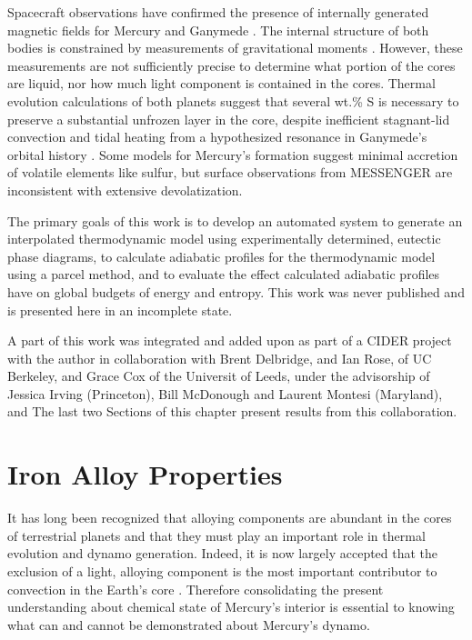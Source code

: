 Spacecraft observations have confirmed the presence of internally generated
magnetic fields for Mercury \cite{Anderson2011} and Ganymede \cite{Kivelson1996}.
The internal structure of both bodies is constrained by measurements of
gravitational moments \cite{Smith2012,Hauck2006}. However, these measurements are
not sufficiently precise to determine what portion of the cores are liquid, nor
how much light component is contained in the cores. Thermal evolution
calculations of both planets \cite{Hauck2004,Hauck2006,Breuer2007,Bland2008} suggest
that several wt.\% S is necessary to preserve a substantial unfrozen layer in
the core, despite inefficient stagnant-lid convection
\cite{Solomatov2000,Hauck2004,Breuer2007} and tidal heating from a hypothesized
resonance in Ganymede's orbital history \cite{Showman1997,Bland2008}. Some models
for Mercury's formation suggest minimal accretion of volatile elements like
sulfur, but surface observations from MESSENGER \cite{Nittler2011,Mccubbin2012} are
inconsistent with extensive devolatization.

The primary goals of this work is to develop an automated system to generate an
interpolated thermodynamic model using experimentally determined, eutectic
phase diagrams, to calculate adiabatic profiles for the thermodynamic model
using a parcel method, and to evaluate the effect calculated adiabatic profiles
have on global budgets of energy and entropy. This work was never published and
is presented here in an incomplete state.

A part of this work was integrated and added upon as part of a CIDER project with the
author in collaboration with Brent Delbridge, and Ian Rose, of UC Berkeley, and Grace
Cox of the Universit of Leeds, under the advisorship of Jessica Irving (Princeton),
Bill McDonough and Laurent Montesi (Maryland), and  The last two Sections of this
chapter present results from this collaboration.

\section{Iron Alloy Properties}

It has long been recognized that alloying components are abundant in the cores
of terrestrial planets and that they must play an important role in thermal
evolution and dynamo generation. Indeed, it is now largely accepted that the
exclusion of a light, alloying component is the most important contributor to
convection in the Earth’s core \citep{Lister1995}. Therefore
consolidating the present understanding about chemical state of Mercury’s
interior is essential to knowing what can and cannot be demonstrated about
Mercury’s dynamo.

